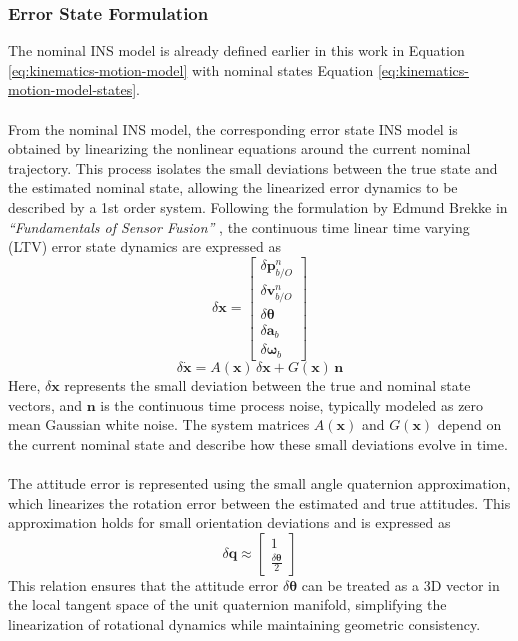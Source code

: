 \subsubsection{Error State Formulation}
The nominal INS model is already defined earlier in this work in Equation \ref{eq:kinematics-motion-model} with nominal states Equation \ref{eq:kinematics-motion-model-states}.
\\ \\
From the nominal INS model, the corresponding error state INS model is obtained by linearizing the nonlinear equations around the current nominal trajectory. This process isolates the small deviations between the true state and the estimated nominal state, allowing the linearized error dynamics to be described by a 1st order system. Following the formulation by Edmund Brekke in \textit{``Fundamentals of Sensor Fusion''} \cite{sensor_fusion_book}, the continuous time linear time varying (LTV) error state dynamics are expressed as
\begin{equation}
    \delta\mathbf{x} =
    \begin{bmatrix}
        \delta\mathbf{p}_{b/O}^{n} \\
        \delta\mathbf{v}_{b/O}^{n} \\
        \delta\mathbf{\theta} \\
        \delta\mathbf{a}_b \\
        \delta\mathbf{\omega}_b
    \end{bmatrix}
    \label{eq:state-estimation-error-states}
\end{equation}
\begin{equation}
    \delta\dot{\mathbf{x}} = A(\mathbf{x}) \, \delta\mathbf{x} + G(\mathbf{x})\,\mathbf{n}
    \label{eq:state-estimation-error-state-dynamics}
\end{equation}
Here, $\delta\mathbf{x}$ represents the small deviation between the true and nominal state vectors, and $\mathbf{n}$ is the continuous time process noise, typically modeled as zero mean Gaussian white noise. The system matrices $A(\mathbf{x})$ and $G(\mathbf{x})$ depend on the current nominal state and describe how these small deviations evolve in time.
\\ \\
The attitude error is represented using the small angle quaternion approximation, which linearizes the rotation error between the estimated and true attitudes. This approximation holds for small orientation deviations and is expressed as
$$
    \delta\mathbf{q} \approx
    \begin{bmatrix}
        1 \\
        \tfrac{\delta\boldsymbol{\theta}}{2}
    \end{bmatrix}
$$
This relation ensures that the attitude error $\delta\boldsymbol{\theta}$ can be treated as a 3D vector in the local tangent space of the unit quaternion manifold, simplifying the linearization of rotational dynamics while maintaining geometric consistency.  



